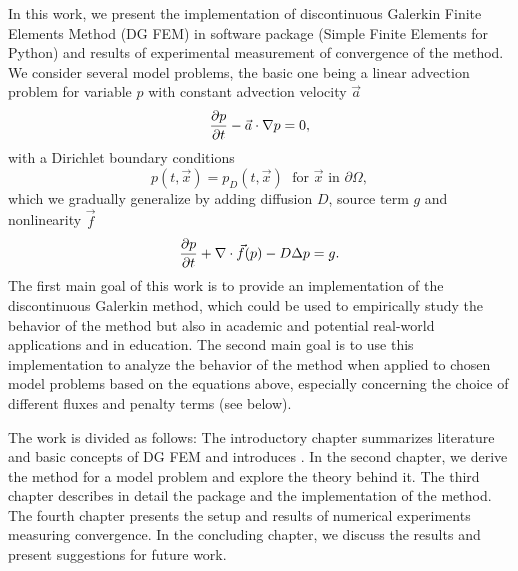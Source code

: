 In this work, we present the implementation of discontinuous Galerkin Finite
Elements Method (DG FEM) in software package \sfepy{} (Simple Finite Elements
for
Python) and results of experimental measurement of convergence of the method.
We consider several model problems, the basic one being a linear
advection problem for variable $p$ with constant advection velocity $\vec{a}$
$$
\frac{\partial p}{\partial t} - \vec{a}\cdot\nabla p = 0,
$$
with a Dirichlet boundary conditions
$$
p(t, \vec{x}) = p_D(t, \vec{x}) \; \text{ for } \vec{x} \text{ in } \partial\Omega,
$$
which we gradually generalize by adding diffusion $D$, source term $g$ and nonlinearity 
$\vec{f}$
\begin{equation*}
\frac{\partial p}{\partial t} + \nabla\cdot \vec{f}(p) - D\Delta p = g.
\end{equation*}
The first main goal of this work is to provide an implementation of
the discontinuous Galerkin
method, which could be used to empirically study the behavior of the method but
also in academic and potential real-world applications and in education. The
second main goal is to use this implementation to analyze the behavior of the
method when applied to chosen model problems based on the equations above,
especially concerning the choice of different fluxes and penalty terms (see below).

The work is divided as follows: The introductory chapter summarizes literature
and basic concepts of DG FEM and introduces \sfepy{}. In the second chapter,
we derive the method for a model problem and explore the theory behind it. The
third chapter describes in detail the \sfepy{} package and the implementation of the
method. The fourth chapter presents the setup and results of numerical
experiments measuring convergence. In the concluding chapter, we discuss the
results and present suggestions for future work.

